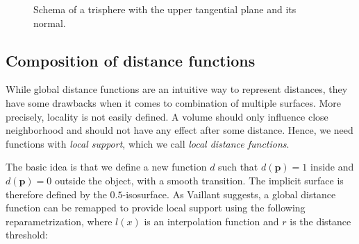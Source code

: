 \documentclass[a4paper,10pt]{article}
\begin{document}
\begin{multicols}{2}
\begin{figure}[H]
\centering
{}
\caption{Schema of a trisphere with the upper tangential plane and its normal.}
\end{figure}


\subsection{Composition of distance functions}
\label{section:sdf_composition}

While global distance functions are an intuitive way to represent distances, they have some drawbacks when it comes to combination of multiple surfaces.
More precisely, locality is not easily defined.
A volume should only influence close neighborhood and should not have any effect after some distance.
Hence, we need functions with \emph{local support}, which we call \emph{local distance functions}.

The basic idea is that we define a new function $d$ such that $d(\mathbf{p}) = 1$ inside and $d(\mathbf{p}) = 0$ outside the object, with a smooth transition.
The implicit surface is therefore defined by the $0.5$-isosurface.
As Vaillant suggests, a global distance function can be remapped to provide local support using the following reparametrization, where $l(x)$ is an interpolation function and $r$ is the distance threshold:


\end{multicols}
\end{document}
